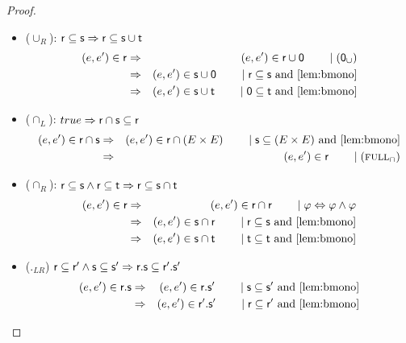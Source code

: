 \documentclass[a4paper,twoside,12pt, english]{article}
\begin{document}
\begin{proof}
\begin{itemize}
\item ($\cup_{R}$): $\sf r \subseteq s \Rightarrow \sf r \subseteq s \cup t$
\begin{eqnarray*}
\edgein \sf r &\impl & \edgein \Relr \cup \0 \reason{(\0_\cup)} \\
&\impl & \edgein \rels \cup \0 \reason{\relr \subseteq \rels \text{ and } \Cref{lem:bmono}}\\
& \impl & \edgein \rels \cup \relt \reason{\0 \subseteq \relt \text{ and } \Cref{lem:bmono}} 
\end{eqnarray*} 

\item ($\cap_{L}$): $true \Rightarrow \sf r \cap s \subseteq r$
\begin{eqnarray*}
(e,e') \in \relr \cap \rels &\impl & \edgein \relr \cap (E \times E) \reason{\rels \subseteq (E \times E) \text{ and } \Cref{lem:bmono}} \\ 
&\impl & (e,e') \in \relr \reason{(\textsc{full}_\cap)} 
\end{eqnarray*}

\item ($\cap_{R}$): $\sf r \subseteq s \land \textsf{\upshape r} \subseteq \textsf{\upshape t} \Rightarrow r \subseteq s \cap t$
\begin{eqnarray*}
(e,e') \in \relr &\impl & \edgein \relr \cap \relr \reason{\phi \Leftrightarrow \phi \land \phi} \\
& \impl &  (e,e') \in \rels \cap \relr \reason{ \relr \subseteq \rels \text{ and } \Cref{lem:bmono}} \\
&\impl & \edgein \rels \cap \relt \reason{\relt \subseteq \relt \text{ and } \Cref{lem:bmono}} 
\end{eqnarray*}

\item ($._{LR}$) $\textsf{\upshape r} \subseteq \textsf{\upshape r}' \land \textsf{\upshape s} \subseteq \textsf{\upshape s}' \Rightarrow \textsf{\upshape r}.\textsf{\upshape s} \subseteq \textsf{\upshape r}'.\textsf{\upshape s}'$
\begin{eqnarray*}
\edgein \Relr.\rels &\impl & \edgein \relr.\rels' \reason{\rels \subseteq \rels' \text{ and } \Cref{lem:bmono}} \\
&\impl & \edgein \relr'.\rels' \reason{\relr \subseteq \relr' \text{ and } \Cref{lem:bmono}}
\end{eqnarray*}



\end{itemize}
\end{proof}
\end{document}
